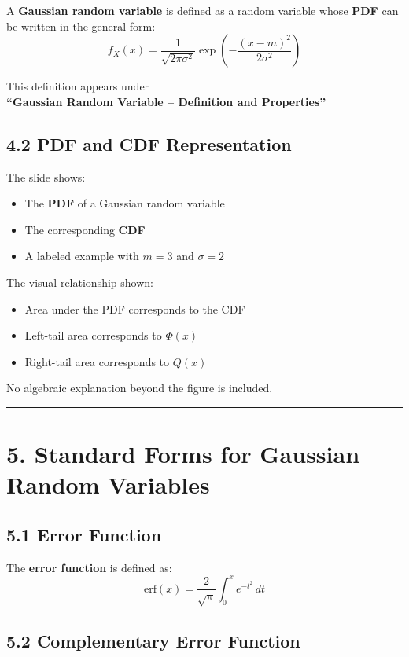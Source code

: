 \documentclass[12pt]{article}
\begin{document}
A \textbf{Gaussian random variable} is defined as a random variable whose \textbf{PDF} can be written in the general form:
\[
f_X(x) =
\frac{1}{\sqrt{2\pi\sigma^2}}
\exp\!\left(
-\frac{(x - m)^2}{2\sigma^2}
\right)
\]

This definition appears under \\
\textbf{“Gaussian Random Variable – Definition and Properties”}

\subsection*{4.2 PDF and CDF Representation}

The slide shows:
\begin{itemize}
    \item The \textbf{PDF} of a Gaussian random variable
    \item The corresponding \textbf{CDF}
    \item A labeled example with $m = 3$ and $\sigma = 2$
\end{itemize}

The visual relationship shown:
\begin{itemize}
    \item Area under the PDF corresponds to the CDF
    \item Left-tail area corresponds to $\Phi(x)$
    \item Right-tail area corresponds to $Q(x)$
\end{itemize}

No algebraic explanation beyond the figure is included.

\hrule
\vspace{1em}

\section*{5. Standard Forms for Gaussian Random Variables}

\subsection*{5.1 Error Function}

The \textbf{error function} is defined as:
\[
\mathrm{erf}(x) =
\frac{2}{\sqrt{\pi}}
\int_0^x e^{-t^2}\, dt
\]

\subsection*{5.2 Complementary Error Function}
\end{document}
